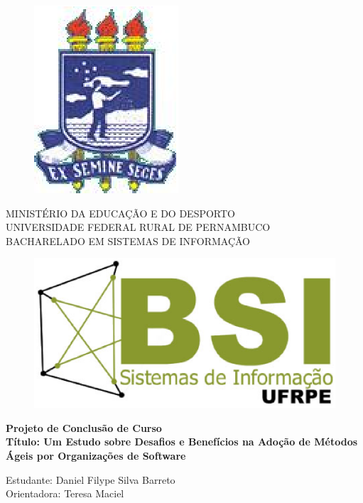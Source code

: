\documentclass[a4paper,11pt]{article}
\begin{document}
\pagestyle {empty}

\vspace*{-2cm}
\begin{figure}[h]
\leavevmode
\begin{minipage}[t]{\textwidth}
\includegraphics[scale=0.7]{logo-ufrpe.eps}
\end{minipage}
\end{figure}

\vspace*{-3.0cm}
{\bf
\begin{center}
{
\hspace*{0cm} 	MINISTÉRIO DA EDUCAÇÃO E DO DESPORTO \\
\hspace*{.2in} UNIVERSIDADE FEDERAL RURAL DE PERNAMBUCO \\
\hspace*{.2in} BACHARELADO EM SISTEMAS DE INFORMAÇÃO} \\
\end{center}}
\vspace{0.0cm}
\noindent
\begin{figure}[h]
\centering
\includegraphics[scale=0.5]{Logo-bsi-presencial-v3-amp.eps}
\end{figure}
\vspace*{2.0cm}
\begin{center}

{\Large \bf  Projeto de Conclusão de Curso}\\[1cm]
{\Large \bf Título: Um Estudo sobre Desafios e Benefícios na Adoção de Métodos Ágeis por Organizações de Software} \\[3cm]
\end{center}
{\Large  Estudante: Daniel Filype Silva Barreto}\\[6mm]
{\Large  Orientadora: Teresa Maciel}\\[6mm]
\end{document}
